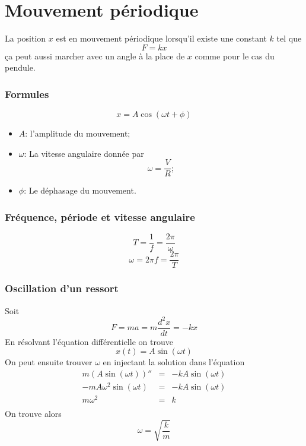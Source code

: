 \part{Mouvement périodique}
La position $x$ est en mouvement périodique lorsqu'il existe une constant $k$ tel que
\[ F = kx \]
ça peut aussi marcher avec un angle à la place de $x$ comme pour le cas du pendule.

\section{Formules}
\[ x = A\cos{(\omega{t} + \phi)} \]
\begin{itemize}
	\item \emph{$A$}: l'amplitude du mouvement;
	\item \emph{$\omega$}: La vitesse angulaire donnée par
		\[\omega = \frac{V}{R};\]
	\item \emph{$\phi$}: Le déphasage du mouvement.
\end{itemize}
\section{Fréquence, période et vitesse angulaire}
\[T = \frac{1}{f} = \frac{2\pi}{\omega}\]
\[\omega = 2\pi{f} = \frac{2\pi}{T}\]

\section{Oscillation d'un ressort}
Soit
\[ F = ma = m\frac{d^2x}{dt} = -kx \]
En résolvant l'équation différentielle on trouve
\[ x(t) = A\sin{(\omega{t})} \]
On peut ensuite trouver $\omega$ en injectant la solution dans l'équation
\[
\begin{array}{rcl}
	m(A\sin{(\omega{t})})'' &=& - kA\sin{(\omega{t})}\\
	-mA\omega^2\sin{(\omega{t})} &=& - kA\sin{(\omega{t})}\\
	m\omega^2 &=& k\\
\end{array}
\]
On trouve alors
\[\omega = \sqrt{\frac{k}{m}}\]

